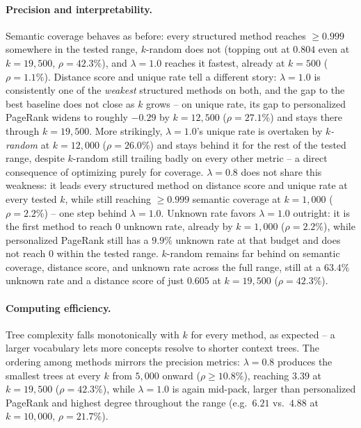\paragraph{Precision and interpretability.} Semantic coverage behaves
as before: every structured method reaches $\ge 0.999$ somewhere in the
tested range, $k$-random does not (topping out at $0.804$ even at
$k=19{,}500$, $\rho=42.3\%$), and $\lambda=1.0$ reaches it fastest, already
at $k=500$ ($\rho=1.1\%$). Distance score and unique rate tell a
different story: $\lambda=1.0$ is consistently one of the \emph{weakest}
structured methods on both, and the gap to the best baseline does not
close as $k$ grows -- on unique rate, its gap to personalized PageRank
widens to roughly $-0.29$ by $k=12{,}500$ ($\rho=27.1\%$) and stays
there through $k=19{,}500$. More strikingly, $\lambda=1.0$'s unique rate
is overtaken by \emph{$k$-random} at $k=12{,}000$ ($\rho=26.0\%$) and
stays behind it for the rest of the tested range, despite $k$-random
still trailing badly on every other metric -- a direct consequence of
optimizing purely for coverage. $\lambda=0.8$ does not share this
weakness: it leads every structured method on distance score and unique
rate at every tested $k$, while still reaching $\ge 0.999$ semantic
coverage at $k=1{,}000$ ($\rho=2.2\%$) -- one step behind $\lambda=1.0$.
Unknown rate favors $\lambda=1.0$ outright: it is the first method to
reach $0$ unknown rate, already by $k=1{,}000$ ($\rho=2.2\%$), while
personalized PageRank still has a $9.9\%$ unknown rate at that budget
and does not reach $0$ within the tested range. $k$-random remains far
behind on semantic coverage, distance score, and unknown rate across the
full range, still at a $63.4\%$ unknown rate and a distance score of
just $0.605$ at $k=19{,}500$ ($\rho=42.3\%$).

\paragraph{Computing efficiency.} Tree complexity falls monotonically
with $k$ for every method, as expected -- a larger vocabulary lets more
concepts resolve to shorter context trees. The ordering among methods
mirrors the precision metrics: $\lambda=0.8$ produces the smallest trees
at every $k$ from $5{,}000$ onward ($\rho \ge 10.8\%$), reaching $3.39$
at $k=19{,}500$ ($\rho=42.3\%$), while $\lambda=1.0$ is again mid-pack,
larger than personalized PageRank and highest degree throughout the
range (e.g.\ $6.21$ vs.\ $4.88$ at $k=10{,}000$, $\rho=21.7\%$).

